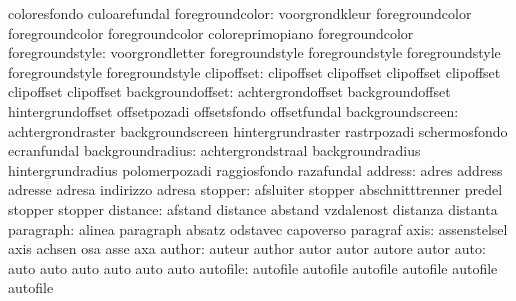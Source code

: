                            coloresfondo              culoarefundal
          foregroundcolor: voorgrondkleur            foregroundcolor
                           foregroundcolor           foregroundcolor
                           coloreprimopiano          foregroundcolor
          foregroundstyle: voorgrondletter           foregroundstyle
                           foregroundstyle           foregroundstyle
                           foregroundstyle           foregroundstyle
clipoffset: clipoffset   clipoffset
            clipoffset   clipoffset
            clipoffset   clipoffset
         backgroundoffset: achtergrondoffset         backgroundoffset
                           hintergrundoffset         offsetpozadi
                           offsetsfondo              offsetfundal
         backgroundscreen: achtergrondraster         backgroundscreen
                           hintergrundraster         rastrpozadi
                           schermosfondo             ecranfundal
         backgroundradius: achtergrondstraal         backgroundradius
                           hintergrundradius         polomerpozadi
                           raggiosfondo              razafundal
                  address: adres                     address
                           adresse                   adresa
                           indirizzo                 adresa
                  stopper: afsluiter                 stopper
                           abschnitttrenner          predel
                           stopper                   stopper
                 distance: afstand                   distance
                           abstand                   vzdalenost
                           distanza                  distanta
                paragraph: alinea                    paragraph
                           absatz                    odstavec
                           capoverso                 paragraf
                     axis: assenstelsel              axis
                           achsen                    osa
                           asse                      axa
                   author: auteur                    author
                           autor                     autor
                           autore                    autor
                     auto: auto                      auto
                           auto                      auto
                           auto                      auto
                 autofile: autofile                  autofile
                           autofile                  autofile
                           autofile                  autofile %
